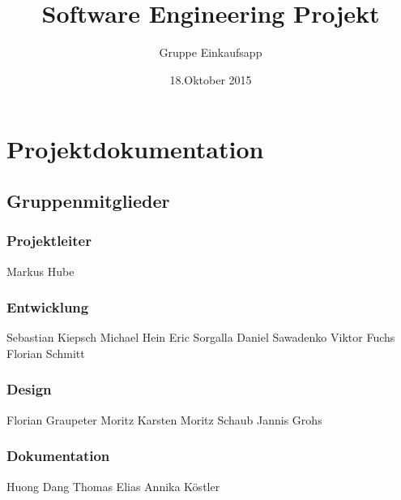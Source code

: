 \documentclass[12pt,a4paper]{article}
\begin{document}
\title{Software Engineering Projekt}
\author{Gruppe Einkaufsapp}
\date {18.Oktober 2015}
\maketitle
\newpage
\tableofcontents
\newpage
\section*{Projektdokumentation}
\subsection*{Gruppenmitglieder}
\subsubsection*{Projektleiter}
Markus Hube
\subsubsection*{Entwicklung}
Sebastian Kiepsch
\newline
Michael Hein
\newline
Eric Sorgalla
\newline
Daniel Sawadenko 
\newline
Viktor Fuchs
\newline
Florian Schmitt 
\subsubsection*{Design}
Florian Graupeter
\newline
Moritz Karsten
\newline
Moritz Schaub
\newline
Jannis Grohs
\subsubsection*{Dokumentation}
Huong Dang
\newline
Thomas Elias
\newline
Annika Köstler

\newpage

\end{document}

